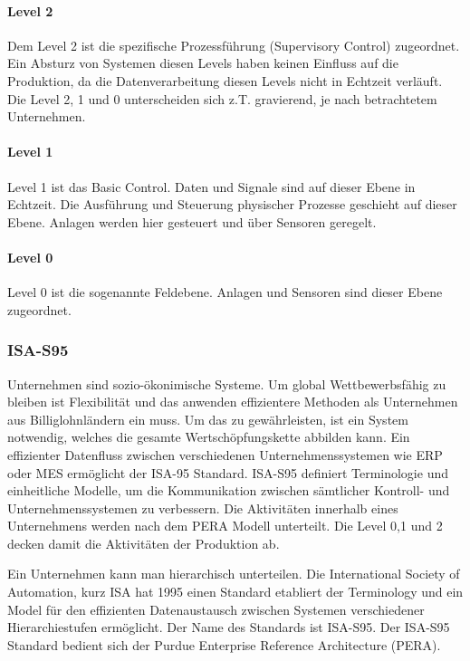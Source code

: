 \documentclass[
fontsize=12pt, 
paper=a4, 
BCOR=10mm, 
twoside=false,
 DIV=10, 
 headsepline, 
 footsepline
 ]{scrartcl}
\begin{document}
\paragraph{Level 2} Dem Level 2 ist die spezifische Prozessführung (Supervisory Control) zugeordnet. Ein Absturz von Systemen diesen Levels haben keinen Einfluss auf die Produktion, da die Datenverarbeitung diesen Levels nicht in Echtzeit verläuft. Die Level 2, 1 und 0 unterscheiden sich z.T. gravierend, je nach betrachtetem Unternehmen.

\paragraph{Level 1} Level 1 ist das Basic Control. Daten und Signale sind auf dieser Ebene in Echtzeit. Die Ausführung und Steuerung physischer Prozesse geschieht auf dieser Ebene. Anlagen werden hier gesteuert und über Sensoren geregelt.

\paragraph{Level 0} Level 0 ist die sogenannte Feldebene. Anlagen und Sensoren sind dieser Ebene zugeordnet.



\subsubsection{ISA-S95}

Unternehmen sind sozio-ökonimische Systeme. Um global Wettbewerbsfähig zu bleiben ist Flexibilität und das anwenden effizientere Methoden als Unternehmen aus Billiglohnländern ein muss. Um das zu gewährleisten, ist ein System notwendig, welches die gesamte Wertschöpfungskette abbilden kann. Ein effizienter Datenfluss zwischen verschiedenen Unternehmenssystemen wie ERP oder MES ermöglicht der ISA-95 Standard. ISA-S95 definiert Terminologie und einheitliche Modelle, um die Kommunikation zwischen sämtlicher Kontroll- und Unternehmenssystemen zu verbessern. Die Aktivitäten innerhalb eines Unternehmens werden nach dem PERA Modell unterteilt. Die Level 0,1 und 2 decken damit die Aktivitäten der Produktion ab.

Ein Unternehmen kann man hierarchisch unterteilen. Die International Society of Automation, kurz ISA hat 1995 einen Standard etabliert der Terminology und ein Model für den effizienten Datenaustausch zwischen Systemen verschiedener Hierarchiestufen ermöglicht. Der Name des Standards ist ISA-S95. Der ISA-S95 Standard bedient sich der Purdue Enterprise Reference Architecture (PERA). 
\end{document}
